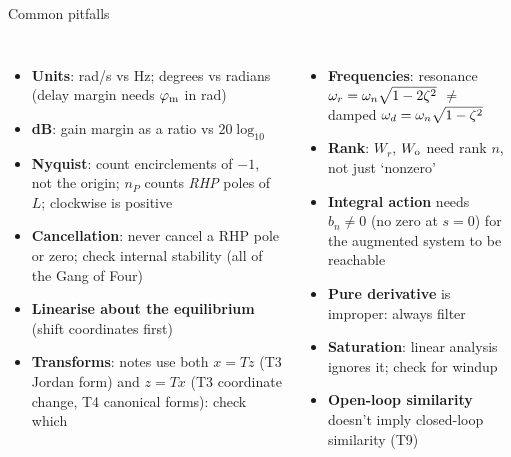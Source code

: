 \documentclass[10pt]{beamer-control}
\begin{document}
\begin{frame}{Common pitfalls}
  \footnotesize
  \begin{columns}[t]
    \begin{itemize}
      \item \textbf{Units}: rad/s vs Hz; degrees vs radians (delay margin needs $\varphi_{\text{m}}$ in rad)
      \item \textbf{dB}: gain margin as a ratio vs $20\log_{10}$
      \item \textbf{Nyquist}: count encirclements of $-1$, not the origin; $n_P$ counts \emph{RHP} poles of $L$; clockwise is positive
      \item \textbf{Cancellation}: never cancel a RHP pole or zero; check internal stability (all of the Gang of Four)
      \item \textbf{Linearise about the equilibrium} (shift coordinates first)
      \item \textbf{Transforms}: notes use both $x=Tz$ (T3 Jordan form) and $z=Tx$ (T3 coordinate change, T4 canonical forms): check which
    \end{itemize}
    \begin{itemize}
      \item \textbf{Frequencies}: resonance $\omega_r = \omega_n\sqrt{1-2\zeta^2}$ $\neq$ damped $\omega_d = \omega_n\sqrt{1-\zeta^2}$
      \item \textbf{Rank}: $W_r$, $W_{\mathrm{o}}$ need rank $n$, not just `nonzero'
      \item \textbf{Integral action} needs $b_n\neq 0$ (no zero at $s=0$) for the augmented system to be reachable
      \item \textbf{Pure derivative} is improper: always filter
      \item \textbf{Saturation}: linear analysis ignores it; check for windup
      \item \textbf{Open-loop similarity} doesn't imply closed-loop similarity (T9)
    \end{itemize}
  \end{columns}
\end{frame}

\end{document}
